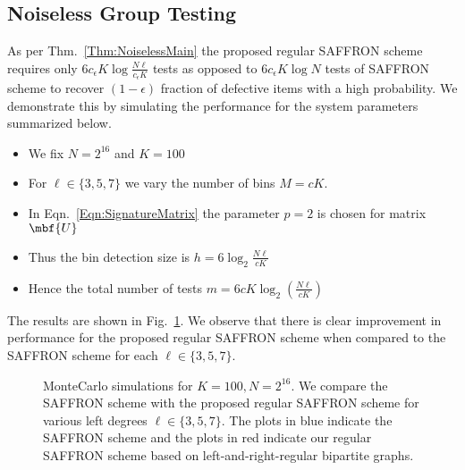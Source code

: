 \documentclass[conference,twocolumn]{IEEEtran}
\newcommand*{\FigPath}{./Figures}
\def\ceps{c_{\epsilon}}
\begin{document}
\subsection*{Noiseless Group Testing}
As per Thm.~\ref{Thm:NoiselessMain} the proposed regular SAFFRON scheme requires only $6\ceps K\log \frac{N\ell}{\ceps K}$ tests as opposed to $6\ceps K\log N$ tests of SAFFRON scheme to recover $(1-\epsilon)$ fraction of defective items with a high probability. We demonstrate this by simulating the performance for the system parameters summarized below.
\begin{itemize}
\item We fix $N=2^{16}$ and $K=100$
\item For $\ell\in\{3,5,7\}$ we vary the number of bins $M=c K$. 
\item In Eqn.~\ref{Eqn:SignatureMatrix} the parameter $p=2$ is chosen for matrix $\mbf{U}$
\item Thus the bin detection size is $h=6\log_2 \frac{N\ell}{cK}$
\item Hence the total number of tests $m=6cK\log_2 \left(\frac{N\ell}{cK}\right)$
\end{itemize} 
The results are shown in Fig.~\ref{Fig:SimulationNoiseless}. We observe that there is clear improvement in performance for the proposed regular SAFFRON scheme when compared to the SAFFRON scheme for each $\ell\in\{3,5,7\}$.

\begin{figure}[t!]
\centering
\resizebox{\columnwidth}{!}{}
\caption{MonteCarlo simulations for $K=100, N=2^{16}$. We compare the SAFFRON scheme \cite{lee2015saffron} with the proposed regular SAFFRON scheme for various left degrees $\ell\in\{3,5,7\}$. 
The plots in blue indicate the SAFFRON scheme and the plots in red indicate our regular SAFFRON scheme based on left-and-right-regular bipartite graphs.}
\label{Fig:SimulationNoiseless}
\end{figure}
\end{document}
